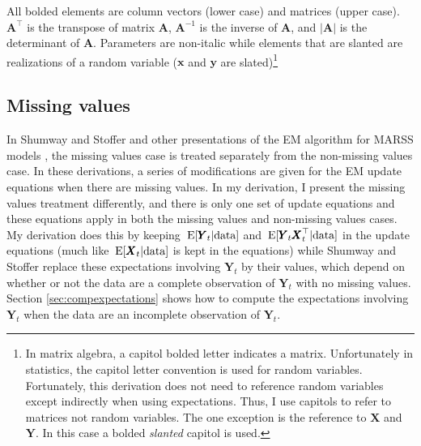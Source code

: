 \documentclass[]{article}
\def\AA{\mbox{$\mathbf A$}}	\def\aa{\mbox{$\mathbf a$}}
\def\XX{\mbox{$\pmb{X}$}}	\def\xx{\mbox{$\pmb{x}$}}
\def\YY{\mbox{$\pmb{Y}$}}	\def\yy{\mbox{$\pmb{y}$}}
\def\E{\,\textup{\textrm{E}}}
\begin{document}
All bolded elements are column vectors (lower case) and matrices (upper case).  $\AA^\top$ is the transpose of matrix $\AA$, $\AA^{-1}$ is the inverse of $\AA$, and $|\AA|$ is the determinant of $\AA$.  Parameters are non-italic while elements that are slanted are realizations of a random variable ($\xx$ and $\yy$ are slated)\footnote{In matrix algebra, a capitol bolded letter indicates a matrix.  Unfortunately in statistics, the capitol letter convention is used for random variables.  Fortunately, this derivation does not need to reference random variables except indirectly when using expectations.  Thus, I use capitols to refer to matrices not random variables.  The one exception is the reference to $\XX$ and $\YY$. In this case a bolded {\it slanted} capitol is used.}
 
\subsection{Missing values}\label{sec:missing}
In Shumway and Stoffer and other presentations of the EM algorithm for MARSS models \citep{ShumwayStoffer2006,Zuuretal2003a}, the missing values case is treated separately from the non-missing values case.  In these derivations, a series of modifications are given for the EM update equations when there are missing values.  In my derivation, I present the missing values treatment differently, and there is only one set of update equations and these equations apply in both the missing values and non-missing values cases. My derivation does this by keeping $\E[\YY_t|\text{data}]$ and $\E[\YY_t\XX_t^\top|\text{data}]$ in the update equations (much like $\E[\XX_t|\text{data}]$ is kept in the equations) while Shumway and Stoffer replace these expectations involving $\YY_t$ by their values, which depend on whether or not the data are a complete observation of $\YY_t$ with no missing values.  Section \ref{sec:compexpectations} shows how to compute the expectations involving $\YY_t$ when the data are an incomplete observation of $\YY_t$.
\end{document}
